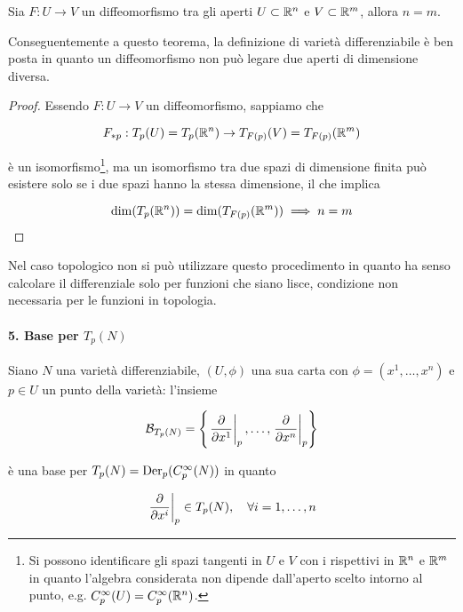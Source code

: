 \begin{theorem}
	Sia $ F : U \to V $ un diffeomorfismo tra gli aperti $ U \subset \mathbb{R}^{n} $ e $ V \subset \mathbb{R}^{m} $, allora $ n = m $.
\end{theorem}

Conseguentemente a questo teorema, la definizione di varietà differenziabile è ben posta in quanto un diffeomorfismo non può legare due aperti di dimensione diversa.

\begin{proof}
	Essendo $ F : U \to V $ un diffeomorfismo, sappiamo che
	
	\begin{equation}
		F_{*p} : T_{p}(U) = T_{p}(\mathbb{R}^{n}) \to T_{F(p)}(V) = T_{F(p)}(\mathbb{R}^{m})
	\end{equation}

	è un isomorfismo\footnote{%
		Si possono identificare gli spazi tangenti in $ U $ e $ V $ con i rispettivi in $ \mathbb{R}^{n} $ e $ \mathbb{R}^{m} $ in quanto l'algebra considerata non dipende dall'aperto scelto intorno al punto, e.g. $ C_{p}^{\infty}(U) = C_{p}^{\infty}(\mathbb{R}^{n}) $.%
	}, ma un isomorfismo tra due spazi di dimensione finita può esistere solo se i due spazi hanno la stessa dimensione, il che implica
	
	\begin{equation}
		\dim(T_{p}(\mathbb{R}^{n})) = \dim(T_{F(p)}(\mathbb{R}^{m})) \implies n = m
	\end{equation}
\end{proof}

Nel caso topologico non si può utilizzare questo procedimento in quanto ha senso calcolare il differenziale solo per funzioni che siano lisce, condizione non necessaria per le funzioni in topologia.

\paragraph{5. Base per $ T_{p}(N) $}

Siano $ N $ una varietà differenziabile, $ (U,\phi) $ una sua carta con $ \phi = (x^{1},\dots,x^{n}) $ e $ p \in U $ un punto della varietà: l'insieme

\begin{equation}
	\B_{T_{p}(N)} = \left\{ \eval{ \pdv{x^{1}} }_{p}, \dots, \eval{ \pdv{x^{n}} }_{p} \right\}
\end{equation}

è una base per $ T_{p}(N) = \operatorname{Der}_{p}(C_{p}^{\infty}(N)) $ in quanto

\begin{equation}
	\eval{ \pdv{x^{i}} }_{p} \in T_{p}(N) \qcomma \forall i=1,\dots,n
\end{equation}


